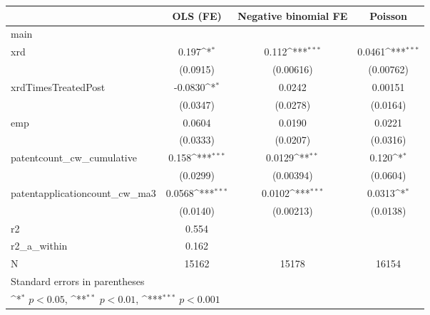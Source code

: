 {
\def\sym#1{\ifmmode^{#1}\else\(^{#1}\)\fi}
\begin{tabular}{l*{3}{c}}
\hline\hline
            &\multicolumn{1}{c}{OLS (FE)}&\multicolumn{1}{c}{Negative binomial FE}&\multicolumn{1}{c}{Poisson}\\
\hline
main        &                     &                     &                     \\
xrd         &       0.197\sym{*}  &       0.112\sym{***}&      0.0461\sym{***}\\
            &    (0.0915)         &   (0.00616)         &   (0.00762)         \\
[1em]
xrdTimesTreatedPost&     -0.0830\sym{*}  &      0.0242         &     0.00151         \\
            &    (0.0347)         &    (0.0278)         &    (0.0164)         \\
[1em]
emp         &      0.0604         &      0.0190         &      0.0221         \\
            &    (0.0333)         &    (0.0207)         &    (0.0316)         \\
[1em]
patentcount\_cw\_cumulative&       0.158\sym{***}&      0.0129\sym{**} &       0.120\sym{*}  \\
            &    (0.0299)         &   (0.00394)         &    (0.0604)         \\
[1em]
patentapplicationcount\_cw\_ma3&      0.0568\sym{***}&      0.0102\sym{***}&      0.0313\sym{*}  \\
            &    (0.0140)         &   (0.00213)         &    (0.0138)         \\
\hline
r2          &       0.554         &                     &                     \\
r2\_a\_within &       0.162         &                     &                     \\
N           &       15162         &       15178         &       16154         \\
\hline\hline
\multicolumn{4}{l}{\footnotesize Standard errors in parentheses}\\
\multicolumn{4}{l}{\footnotesize \sym{*} \(p<0.05\), \sym{**} \(p<0.01\), \sym{***} \(p<0.001\)}\\
\end{tabular}
}
